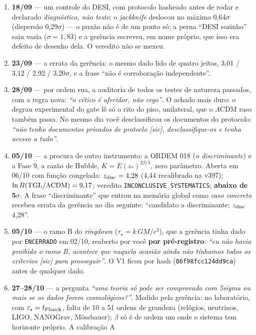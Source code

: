 \begin{enumerate}[leftmargin=1.5em]
\item \textbf{18/09} --- um controle do DESI, com protocolo hasheado antes de rodar e declarado
\emph{diagnóstico, não teste}: o \emph{jackknife} deslocou no máximo 0,64$\sigma$ (dispersão
0,29$\sigma$) --- o puxão não é de um ponto só; a perna ``DESI sozinho'' saiu vazia
($\sigma = 1{,}83$) e a gerência escreveu, em nome próprio, que isso era defeito de desenho dela.
O veredito não se mexeu.
\item \textbf{23/09} --- a errata da gerência: o mesmo dado lido de quatro jeitos, 3,01 / 3,12 /
2,92 / 3,20$\sigma$, e a frase ``não é corroboração independente''.
\item \textbf{28/09} --- por ordem sua, a auditoria de todos os testes de natureza passados, com a
regra nova: \emph{``o cético é aferidor, não cego''}. O achado mais duro: o degrau experimental do
gate lê só o rito do piso, unilateral, que o $\Lambda$CDM raso também passa. No mesmo dia você
desclassificou os documentos do protocolo: \emph{``não tenho documentos privados de protoclo
[sic], desclassifique-os e tenha acesso a tudo''}.
\item \textbf{05/10} --- a procura de outro instrumento: a ORDEM 018 (\emph{o discriminante}) e a
Fase 9, a razão de Hubble, $K = E(z_*)^{2\beta/3}$, zero parâmetro. Aberta em 06/10 com função
congelada: $z_{\rm disc} = 4{,}28$ (4,44 recalibrado na v397); $\ln B({\rm TGL}/\Lambda{\rm CDM})
= 9{,}17$; veredito \texttt{INCONCLUSIVE\_SYSTEMATICS}; \textbf{abaixo de 5$\sigma$}. A frase
``discriminante'' que entrou na memória global como \emph{caso concreto} recebeu errata da
gerência no dia seguinte: ``candidato a discriminante; $z_{\rm disc}$ 4,28''.
\item \textbf{05/10} --- o ramo B do \emph{ringdown} ($\tau_\star = k\,GM/c^3$), que a gerência
tinha dado por \texttt{ENCERRADO} em 02/10, reaberto por você \textbf{por pré-registro}:
\emph{``eu não havia proibido o ramo B, acontece que naquela ocasião ainda não tínhamos todos os
críterios [sic] para prosseguir''}. O V1 ficou por hash (\texttt{86f98fcc124dd9ca}) antes de
qualquer dado.
\item \textbf{27--28/10} --- a pergunta \emph{``uma teoria só pode ser comprovada com 5sigma ou
mais se os dados forem cosmológicos?''}. Medido pela gerência: no laboratório, com
$\tau_\star = t_{\rm Planck}$, falta de 10 a 51 ordens de grandeza (relógios, neutrinos, LIGO,
NANOGrav, Mössbauer); $\beta$ só é de ordem um onde o sistema tem horizonte próprio. A calibração A

\end{enumerate}
